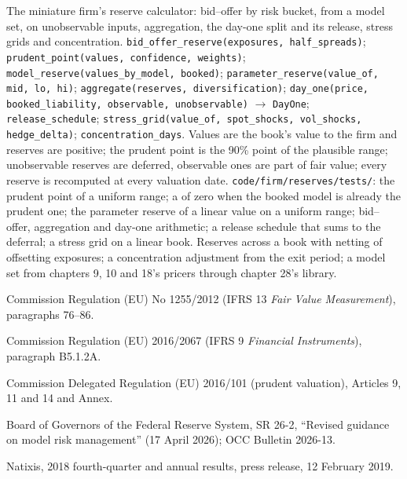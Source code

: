 \begin{build}
 The miniature firm's reserve calculator: bid--offer by risk bucket,  from a model set,  on unobservable inputs,
aggregation, the day-one split and its release, stress grids and concentration.
 \texttt{bid\_offer\_reserve(exposures, half\_spreads)}; \texttt{prudent\_point(values, confidence, weights)}; \texttt{model\_reserve(values\_by\_model,
booked)}; \texttt{parameter\_reserve(value\_of, mid, lo, hi)}; \texttt{aggregate(reserves, diversification)}; \texttt{day\_one(price, booked\_liability, observable,
unobservable)} $\to$ \texttt{DayOne}; \texttt{release\_schedule}; \texttt{stress\_grid(value\_of, spot\_shocks, vol\_shocks, hedge\_delta)}; \texttt{concentration\_days}.
 Values are the book's value to the firm and reserves are positive; the prudent point is the 90\% point of the plausible range; unobservable reserves are
deferred, observable ones are part of fair value; every reserve is recomputed at every valuation date.
 \texttt{code/firm/reserves/tests/}: the prudent point of a uniform range; a  of zero when the booked model is already the prudent one;
the parameter reserve of a linear value on a uniform range; bid--offer, aggregation and day-one arithmetic; a release schedule that sums to the deferral; a stress grid on a
linear book.
 Reserves across a book with netting of offsetting exposures; a concentration adjustment from the exit period; a model set from chapters 9, 10 and 18's
pricers through chapter 28's library.
\end{build}

\begin{omsources}
\item Commission Regulation (EU) No 1255/2012 (IFRS 13 \emph{Fair Value Measurement}), paragraphs 76--86.
\item Commission Regulation (EU) 2016/2067 (IFRS 9 \emph{Financial Instruments}), paragraph B5.1.2A.
\item Commission Delegated Regulation (EU) 2016/101 (prudent valuation), Articles 9, 11 and 14 and Annex.
\item Board of Governors of the Federal Reserve System, SR 26-2, ``Revised guidance on model risk management'' (17 April 2026); OCC Bulletin 2026-13.
\item Natixis, 2018 fourth-quarter and annual results, press release, 12 February 2019.
\end{omsources}


